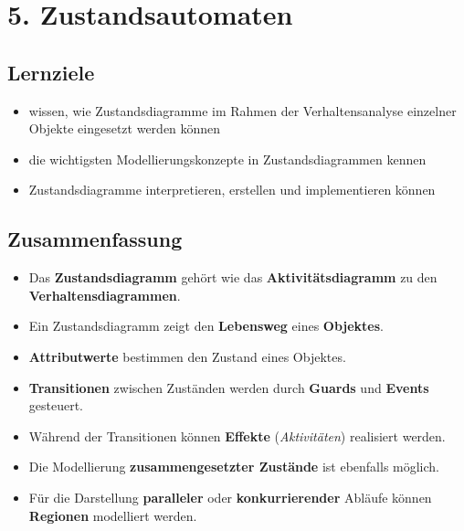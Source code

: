 \section*{5. Zustandsautomaten}

\subsection*{Lernziele}
\begin{itemize}
    \item wissen, wie Zustandsdiagramme im Rahmen der Verhaltensanalyse einzelner Objekte eingesetzt werden können
    \item die wichtigsten Modellierungskonzepte in Zustandsdiagrammen kennen
    \item Zustandsdiagramme interpretieren, erstellen und implementieren können
\end{itemize}

\subsection*{Zusammenfassung}

\begin{itemize}
    \item Das \textbf{Zustandsdiagramm} gehört wie das \textbf{Aktivitätsdiagramm} zu den \textbf{Verhaltensdiagrammen}.
    \item Ein Zustandsdiagramm zeigt den \textbf{Lebensweg} eines \textbf{Objektes}.
    \item \textbf{Attributwerte} bestimmen den Zustand eines Objektes.
    \item \textbf{Transitionen} zwischen Zuständen werden durch \textbf{Guards} und \textbf{Events} gesteuert.
    \item Während der Transitionen können \textbf{Effekte} (\textit{Aktivitäten}) realisiert werden.
    \item Die Modellierung \textbf{zusammengesetzter Zustände} ist ebenfalls möglich.
    \item Für die Darstellung \textbf{paralleler} oder  \textbf{konkurrierender} Abläufe können \textbf{Regionen} modelliert werden.
\end{itemize}
